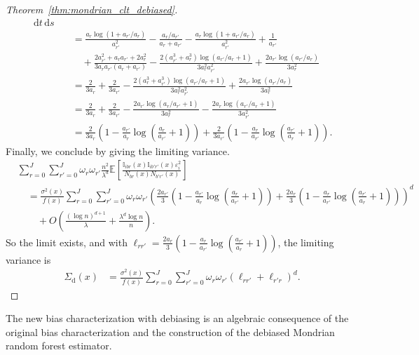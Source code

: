 \documentclass[11pt,lof]{puthesis}
\newcommand{\E}{\ensuremath{\mathbb{E}}}
\newcommand{\I}{\ensuremath{\mathbb{I}}}
\newcommand{\rd}{\ensuremath{\mathrm{d}}}
\newcommand{\diff}[1]{\,\mathrm{d}#1}
\theoremstyle{break}
\theoremstyle{proof}
\newtheorem{proof}{Proof}
\begin{document}
\begin{proof}[Theorem~\ref{thm:mondrian_clt_debiased}]
\begin{align*}
\diff t
\diff s \\
&\quad=
\frac{a_r \log(1+a_{r'} / a_r)}{a_{r'}^2}
- \frac{a_r / a_{r'}}{a_r + a_{r'}}
- \frac{a_r \log(1 + a_{r'} / a_r)}{a_{r'}^2}
+ \frac{1}{a_{r'}} \\
&\qquad+
\frac{2 a_{r'}^2 + a_r a_{r'} + 2 a_r^2}
{3 a_r a_{r'} (a_r + a_{r'})}
- \frac{2(a_{r'}^3 + a_r^3) \log(a_{r'} / a_r+1)}{3 a_r^2 a_{r'}^2}
+ \frac{2 a_{r'} \log (a_{r'} / a_r)}{3 a_r^2} \\
&\quad=
\frac{2}{3 a_r} + \frac{2}{3 a_{r'}}
- \frac{2(a_r^3 + a_{r'}^3 ) \log(a_{r'} / a_{r}+1)}
{3 a_r^2 a_{r'}^2}
+ \frac{2 a_{r'} \log (a_{r'} / a_{r})}{3 a_r^2} \\
&\quad=
\frac{2}{3 a_r}
+ \frac{2}{3 a_{r'}}
- \frac{2 a_{r'} \log(a_{r} / a_{r'} + 1)}{3 a_r^2}
- \frac{2 a_r \log(a_{r'} / a_{r} + 1)}{3 a_{r'}^2} \\
&\quad=
\frac{2}{3 a_r}
\left(
1 - \frac{a_{r'}}{a_r}
\log\left(\frac{a_{r}}{a_{r'}} + 1\right)
\right)
+ \frac{2}{3 a_{r'}}
\left(
1 - \frac{a_r }{a_{r'}}
\log\left(\frac{a_{r'}}{a_{r}} + 1\right)
\right).
\end{align*}
%
Finally, we conclude by giving the limiting variance.
%
\begin{align*}
&\sum_{r=0}^{J}
\sum_{r'=0}^{J}
\omega_r
\omega_{r'}
\frac{n^2}{\lambda^d}
\E \left[
\frac{\I_{i b r}(x) \I_{i b' r'}(x) \varepsilon_i^2}
{N_{b r}(x) N_{b' r'}(x)}
\right] \\
&\quad=
\frac{\sigma^2(x)}{f(x)}
\sum_{r=0}^{J}
\sum_{r'=0}^{J}
\omega_r
\omega_{r'}
\left(
\frac{2 a_{r'}}{3}
\left(
1 - \frac{a_{r'}}{a_r}
\log\left(\frac{a_r}{a_{r'}} + 1\right)
\right)
+ \frac{2 a_r}{3}
\left(
1 - \frac{a_r}{a_{r'}}
\log\left(\frac{a_{r'}}{a_r} + 1\right)
\right)
\right)^d \\
&\qquad+
O \left(
\frac{(\log n)^{d+1}}{\lambda}
+ \frac{\lambda^d \log n}{n}
\right).
\end{align*}
%
So the limit exists, and
with $\ell_{r r'} = \frac{2 a_r}{3} \left( 1 - \frac{a_{r}}{a_{r'}}
\log\left(\frac{a_{r'}}{a_{r}} + 1\right) \right)$,
the limiting variance is
%
\begin{align*}
\Sigma_\rd(x)
&=
\frac{\sigma^2(x)}{f(x)}
\sum_{r=0}^{J} \sum_{r'=0}^{J} \omega_r \omega_{r'}
\left( \ell_{r r'} + \ell_{r' r} \right)^d.
\end{align*}
%
\end{proof}

The new bias characterization with debiasing is an algebraic
consequence of the original bias characterization and the construction
of the debiased Mondrian random forest estimator.
\end{document}

